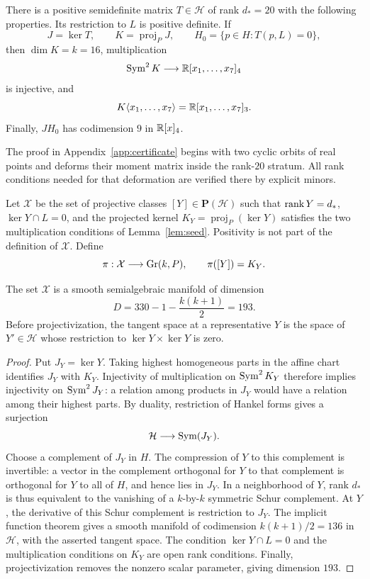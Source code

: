 \begin{lemma}
\label{lem:seed}
There is a positive semidefinite matrix $T\in\mathcal H$ of rank $d_*=20$
with the following properties. Its restriction to $L$ is positive
definite. If
\[
 J=\ker T,\qquad K=\operatorname{proj}_P J,
 \qquad H_0=\{p\in H:T(p,L)=0\},
\]
then $\dim K=k=16$, multiplication
\[
 \operatorname{Sym}^2K\longrightarrow\mathbb R[x_1,\ldots,x_7]_4
\]
is injective, and
\begin{equation}
\label{eq:pure-cubic-spanning}
 K\langle x_1,\ldots,x_7\rangle
   =\mathbb R[x_1,\ldots,x_7]_3.
\end{equation}
Finally, $JH_0$ has codimension $9$ in $\mathbb R[x]_4$.
\end{lemma}

The proof in Appendix~\ref{app:certificate} begins with two cyclic
orbits of real points and deforms their moment matrix inside the
rank-$20$ stratum. All rank conditions needed for that deformation are
verified there by explicit minors.

Let $\mathcal X$ be the set of projective classes $[Y]\in\mathbf P(\mathcal H)$
such that $\operatorname{rank} Y=d_*$, $\ker Y\cap L=0$, and the projected kernel
$K_Y=\operatorname{proj}_P(\ker Y)$ satisfies the two multiplication
conditions of Lemma~\ref{lem:seed}. Positivity is not part of the
definition of $\mathcal X$. Define
\[
 \pi:\mathcal X\longrightarrow\operatorname{Gr}(k,P),
 \qquad \pi([Y])=K_Y.
\]

\begin{lemma}
\label{lem:hankel-stratum}
The set $\mathcal X$ is a smooth semialgebraic manifold of dimension
\[
 D=330-1-\frac{k(k+1)}2=193.
\]
Before projectivization, the tangent space at a representative $Y$ is
the space of $Y'\in\mathcal H$ whose restriction to
$\ker Y\times\ker Y$ is zero.
\end{lemma}

\begin{proof}
Put $J_Y=\ker Y$. Taking highest homogeneous parts in the affine chart
identifies $J_Y$ with $K_Y$. Injectivity of multiplication on
$\operatorname{Sym}^2K_Y$ therefore implies injectivity on $\operatorname{Sym}^2J_Y$: a relation
among products in $J_Y$ would have a relation among their highest parts.
By duality, restriction of Hankel forms gives a surjection
\[
 \mathcal H\longrightarrow\operatorname{Sym}(J_Y).
\]
Choose a complement of $J_Y$ in $H$. The compression of $Y$ to this
complement is invertible: a vector in the complement orthogonal for
$Y$ to that complement is orthogonal for $Y$ to all of $H$, and hence
lies in $J_Y$. In a neighborhood of $Y$, rank $d_*$ is thus equivalent
to the vanishing of a $k$-by-$k$ symmetric Schur complement. At $Y$,
the derivative of this Schur complement is restriction to $J_Y$.
The implicit function theorem gives a smooth manifold of codimension
$k(k+1)/2=136$ in $\mathcal H$, with the asserted tangent space.
The condition $\ker Y\cap L=0$ and the multiplication conditions on
$K_Y$ are open rank conditions. Finally, projectivization removes the
nonzero scalar parameter, giving dimension $193$.
\end{proof}

